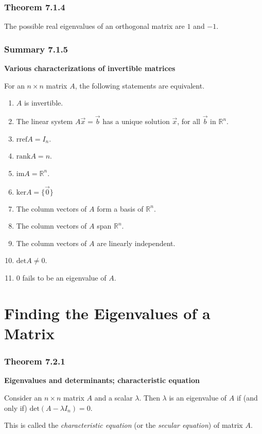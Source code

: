 \documentclass{report}
\begin{document}
\subsubsection*{Theorem 7.1.4}
\par\noindent The possible real eigenvalues of an orthogonal matrix are $1$ and $-1$.
\subsubsection*{Summary 7.1.5}
\par\noindent\textbf{Various characterizations of invertible matrices}
\par\noindent For an $n\times{}n$ matrix $A$, the following statements are equivalent.
\renewcommand{\labelenumi}{\textbf{\roman{enumi}.}}
\begin{enumerate}
\item $A$ is invertible.
\item The linear system $A\vec{x}=\vec{b}$ has a unique solution $\vec{x}$, for all $\vec{b}$ in $\mathbb{R}^{n}$.
\item $\textrm{rref}A=I_{n}$.
\item $\textrm{rank}A=n$.
\item $\textrm{im}A=\mathbb{R}^{n}$.
\item $\textrm{ker}A=\{\vec{0}\}$
\item The column vectors of $A$ form a basis of $\mathbb{R}^{n}$.
\item The column vectors of $A$ span $\mathbb{R}^{n}$.
\item The column vectors of $A$ are linearly independent.
\item $\textrm{det}A\ne{}0$.
\item $0$ fails to be an eigenvalue of $A$.
\end{enumerate}

\section{Finding the Eigenvalues of a Matrix}
\subsubsection*{Theorem 7.2.1}
\par\noindent\textbf{Eigenvalues and determinants; characteristic equation}
\par\noindent Consider an $n\times{}n$ matrix $A$ and a scalar $\lambda{}$. Then $\lambda{}$ is an eigenvalue of $A$ if (and only if) $\textrm{det}(A-\lambda{}I_{n})=0$.
\par\noindent This is called the \textit{characteristic equation} (or the \textit{secular equation}) of matrix $A$.
\end{document}
